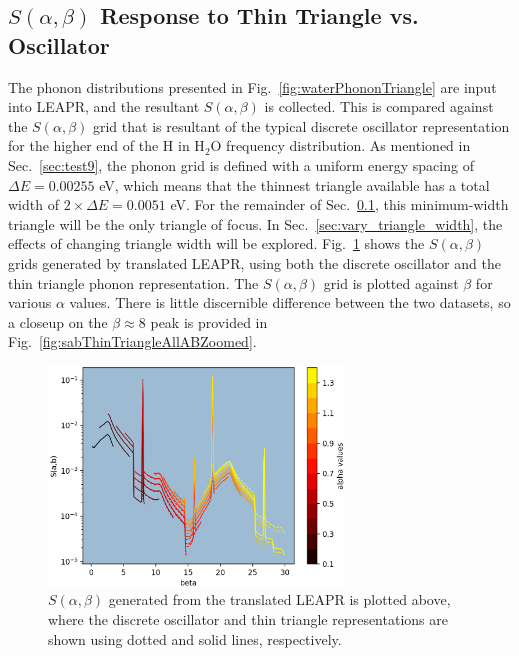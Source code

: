 \documentclass[Master.tex]{subfiles}
\begin{document}
  \subsection{$S(\alpha,\beta)$ Response to Thin Triangle vs. Oscillator}\label{sec:thin_triangle_vs_delta}
    The phonon distributions presented in Fig.~\ref{fig:waterPhononTriangle} are input into LEAPR, and the resultant $S(\alpha,\beta)$ is collected. This is compared against the $S(\alpha,\beta)$ grid that is resultant of the typical discrete oscillator representation for the higher end of the H in H$_2$O frequency distribution. As mentioned in Sec.~\ref{sec:test9}, the phonon grid is defined with a uniform energy spacing of $\Delta E=0.00255$  eV, which means that the thinnest triangle available has a total width of $2\times\Delta E=0.0051$ eV. For the remainder of Sec.~\ref{sec:thin_triangle_vs_delta}, this minimum-width triangle will be the only triangle of focus. In Sec.~\ref{sec:vary_triangle_width}, the effects of changing triangle width will be explored.
    Fig.~\ref{fig:sabThinTriangleAllAB} shows the $S(\alpha,\beta)$ grids generated by translated LEAPR, using both the discrete oscillator and the thin triangle phonon representation. The $S(\alpha,\beta)$ grid is plotted against $\beta$ for various $\alpha$ values. There is little discernible difference between the two datasets, so a closeup on the $\beta\approx8$ peak is provided in Fig.~\ref{fig:sabThinTriangleAllABZoomed}.

    \begin{figure}[h]
      \begin{center}
        \includegraphics[width=0.7\textwidth]{sab_thinTriangle_and_delta_all_ABb}
        \caption[$S(\alpha,\beta)$ grid, comparing oscillator vs. thin triangle representation (translated LEAPR used)]{$S(\alpha,\beta)$ generated from the translated LEAPR is plotted above, where the discrete oscillator and thin triangle representations are shown using dotted and solid lines, respectively.}
        \label{fig:sabThinTriangleAllAB}
      \end{center}
    \end{figure}
\end{document}
